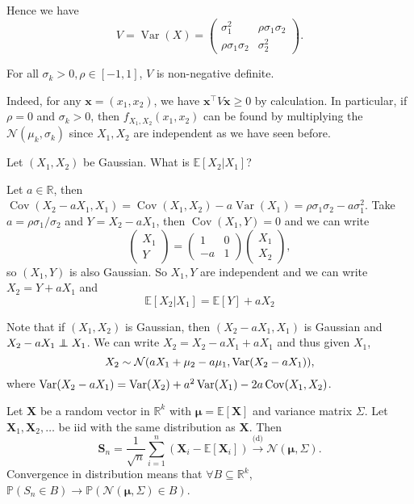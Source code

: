 Hence we have
$$V=\operatorname{Var}(X)=\begin{pmatrix}
    \sigma_1^2&\rho\sigma_1\sigma_2\\
    \rho\sigma_1\sigma_2&\sigma_2^2
\end{pmatrix}.$$


\begin{claim}
    For all $ \sigma_k>0,\rho\in [-1,1] $, $V$ is non-negative definite.
\end{claim}
Indeed, for any $\mathbf{x}=(x_1,x_2)$, we have $\mathbf{x}^\top V\mathbf{x}\ge 0$ by calculation. In particular, if $\rho=0$ and $\sigma_k>0$, then $f_{X_1,X_2}(x_1,x_2)$ can be found by multiplying the $\mathcal N(\mu_k,\sigma_k)$ since $X_1,X_2$ are independent as we have seen before.


\begin{sque}
    Let $ (X_1,X_2) $ be Gaussian. What is $ \mathbb{E}[X_2|X_1] $?
\end{sque}

Let $a\in\mathbb R$, then $\operatorname{Cov}(X_2-aX_1,X_1)=\operatorname{Cov}(X_1,X_2)-a\operatorname{Var}(X_1)=\rho\sigma_1\sigma_2-a\sigma_1^2$. Take $a=\rho\sigma_1/\sigma_2$ and $Y=X_2-aX_1$, then $\operatorname{Cov}(X_1,Y)=0$ and we can write
$$\begin{pmatrix}
    X_1\\
    Y
\end{pmatrix}=\begin{pmatrix}
    1&0\\
    -a&1
\end{pmatrix}\begin{pmatrix}
    X_1\\
    X_2
\end{pmatrix},$$
so $(X_1,Y)$ is also Gaussian. So $X_1,Y$ are independent and we can write $X_2=Y+aX_1$ and
\[
    \boxed{\mathbb E[X_2|X_1]=\mathbb E[Y]+aX_2}
\]
\begin{note}
    Note that if $ (X_1,X_2) $ is Gaussian, then $ (X_2-aX_1,X_1) $ is Gaussian and $ X_2-aX_1 \independent X_1 $. We can write $ X_2=X_2-aX_1+aX_1 $ and thus given $ X_1 $, 
    \[
        X_2 \sim \mathcal{N} (aX_1+\mu_2-a\mu_1, \operatorname{Var}(X_2-aX_1)),
    \]
    where $ \operatorname{Var}(X_2-aX_1) =\operatorname{Var}(X_2)+a^2\operatorname{Var}(X_1)-2a\operatorname{Cov}(X_1,X_2)  $.
\end{note}

\begin{theorem}
    Let $ \mathbf{X} $ be a random vector in $ \mathbb{R}^{k} $ with $ \boldsymbol{\mu}=\mathbb{E}[\mathbf{X}] $ and variance matrix $ \Sigma $. Let $ \mathbf{X}_1,\mathbf{X}_2,\dots $ be iid with the same distribution as $ \mathbf{X} $. Then 
    \[
        \mathbf{S}_n=\frac{1}{\sqrt{n}}\sum_{i=1}^n(\mathbf{X}_i-\mathbb E[\mathbf{X}_i])\xrightarrow{\text{(d)}}\mathcal N(\boldsymbol{\mu},\Sigma).
    \]
    Convergence in distribution means that $ \forall B \subseteq \mathbb{R}^{k} $, $ \mathbb{P}(S_n\in B) \to \mathbb{P}(\mathcal{N}(\boldsymbol{\mu},\Sigma)\in B) $.
\end{theorem}


